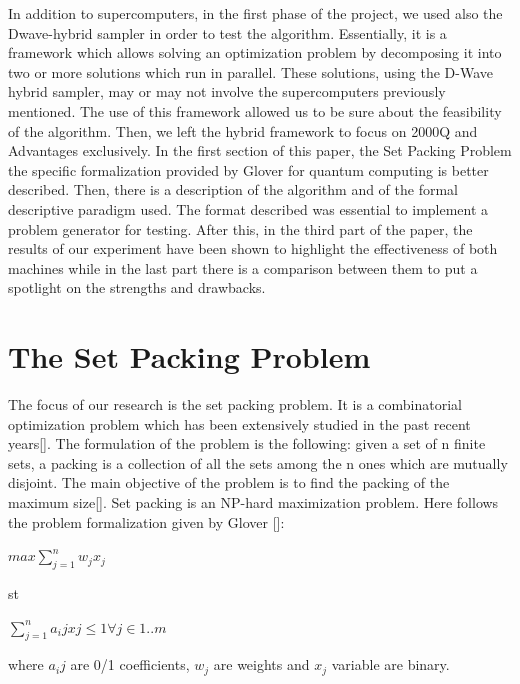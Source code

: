 \documentclass[oneside,a4paper]{article}
\begin{document}
In addition to supercomputers, in the first phase of the project, we used also the Dwave-hybrid sampler \cite{WebSite6} in order to test the algorithm. Essentially, it is a framework which allows solving an optimization problem by decomposing it into two or more solutions which run in parallel. These solutions, using the D-Wave hybrid sampler, may or may not involve the supercomputers previously mentioned. The use of this framework allowed us to be sure about the feasibility of the algorithm. Then, we left the hybrid framework to focus on 2000Q and Advantages exclusively.
In the first section of this paper, the Set Packing Problem the specific formalization provided by Glover for quantum computing\cite{Website1} is better described. Then, there is a description of the algorithm and of the formal descriptive paradigm used. The format described was essential to implement a problem generator for testing. After this, in the third part of the paper, the results of our experiment have been shown to highlight the effectiveness of both machines while in the last part there is a comparison between them to put a spotlight on the strengths and drawbacks.

\section{The Set Packing Problem}


The focus of our research is the set packing problem. It is a combinatorial optimization problem which has been extensively studied in the past recent years[]. The formulation of the problem is the following: given a set of n finite sets, a packing is a collection of all the sets among the n ones which are mutually disjoint. The main objective of the problem is to find the packing of the maximum size[]. Set packing is an NP-hard maximization problem. Here follows the problem formalization given by Glover []:


\centerline{${ max {\sum_{j=1}^{n}w_jx_j}}$}
\centerline{
st
}

\centerline{${\sum_{j=1}^{n}a_ijxj \leq 1 \forall j \in 1..m}$}

\setlength\parindent{0pt}where ${a_ij}$ are 0/1 coefficients, ${w_j}$ are weights and ${x_j}$ variable are binary.
\end{document}
